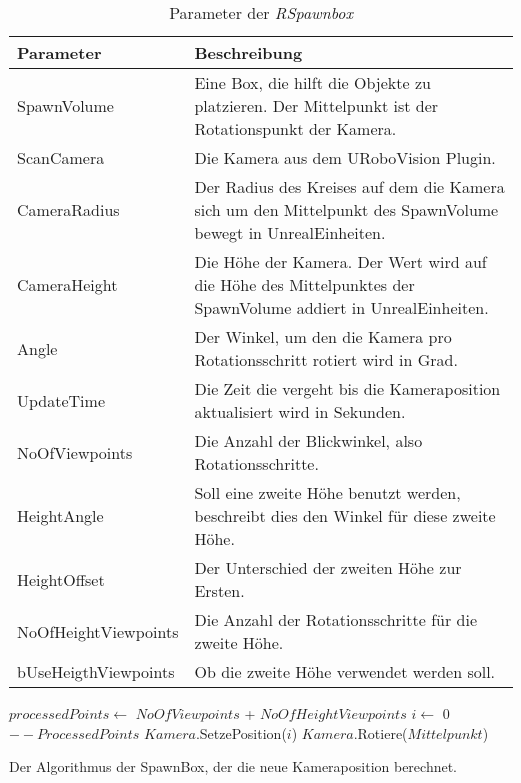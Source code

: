 \begin{table}
\begin{tabularx}{\textwidth}{lX}
\textbf{Parameter}  & \textbf{Beschreibung} \\ \hline
SpawnVolume         & Eine Box, die hilft die Objekte zu platzieren. Der Mittelpunkt ist der Rotationspunkt der Kamera.\\  
ScanCamera          & Die Kamera aus dem URoboVision Plugin. \\ 
CameraRadius        & Der Radius des Kreises auf dem die Kamera sich um den Mittelpunkt des SpawnVolume bewegt in UnrealEinheiten.\\ 
CameraHeight        & Die Höhe der Kamera. Der Wert wird auf die Höhe des Mittelpunktes der SpawnVolume addiert in UnrealEinheiten.\\ 
Angle               & Der Winkel, um den die Kamera pro Rotationsschritt rotiert wird in Grad.\\ 
UpdateTime          & Die Zeit die vergeht bis die Kameraposition aktualisiert wird in Sekunden.\\ 
NoOfViewpoints      & Die Anzahl der Blickwinkel, also Rotationsschritte.\\ 
HeightAngle         & Soll eine zweite Höhe benutzt werden, beschreibt dies den Winkel für diese zweite Höhe.\\ 
HeightOffset        & Der Unterschied der zweiten Höhe zur Ersten.\\
NoOfHeightViewpoints & Die Anzahl der Rotationsschritte für die zweite Höhe.\\ 
bUseHeigthViewpoints & Ob die zweite Höhe verwendet werden soll. \\  \hline
\end{tabularx}
\caption{Parameter der \textit{RSpawnbox}}
\label{tab:spawnboxParams}
\end{table}

\begin{algorithm}[H]
\BlankLine
$processedPoints \gets$ $NoOfViewpoints$ + $NoOfHeightViewpoints$\;
$i \gets$ 0\;
$--ProcessedPoints$\;
$Kamera$.SetzePosition($i$)\;
$Kamera$.Rotiere($Mittelpunkt$)\;
\caption[SpawnBox]{Der Algorithmus der SpawnBox, der die neue Kameraposition berechnet.}
\label{alg:SpawnBox}
\end{algorithm}

